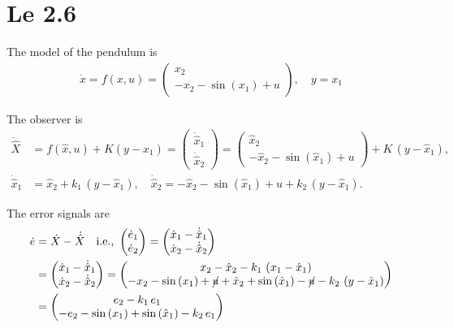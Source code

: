 \section{Le 2.6}
The model of the pendulum is 
\begin{align*}
    \dot x = f(x,u) = \begin{pmatrix}
        x_2 \\ -x_2 - \sin\left(x_1\right) + u
    \end{pmatrix}, \quad y = x_1
\end{align*}

The observer is 
\begin{align*}
    \dot{\hat X} &= f(\hat x,u) + K\left(y - \hat x_1\right) = \begin{pmatrix}
        \dot{\hat x}_1 \\ \dot{\hat x}_2
    \end{pmatrix} = \begin{pmatrix}
        \hat x_2 \\ -\hat x_2 - \sin\left(\hat x_1\right) + u
    \end{pmatrix} + K\,\left(y - \hat x_1\right), \\
    \dot{\hat x}_1 &= \hat x_2 + k_1\,\left(y - \hat x_1\right), \quad \dot{\hat x}_2 = -\hat x_2 - \sin\left(\hat x_1\right) + u + k_2\,\left(y - \hat x_1\right).
\end{align*}

The error signals are
\begin{align*}
    \dot e &= \dot X - \dot{\hat X} \quad \text{i.e., } \begin{pmatrix} \dot e_1 \\ \dot e_2 \end{pmatrix} = \begin{pmatrix} \dot x_1 - \dot{\hat x}_1 \\ \dot x_2 - \dot{\hat x}_2 \end{pmatrix} \\
    &= \begin{pmatrix} 
        \dot x_1 - \dot{\hat x}_1 \\ 
        \dot x_2 - \dot{\hat x}_2 
    \end{pmatrix} = \begin{pmatrix}
                        x_2 - \hat x_2 - k_1\,\left(x_1 - \hat x_1\right) \\
                        -x_2 - \sin\left(x_1\right) + \cancel{u} + \hat x_2 + \sin\left(\hat x_1\right) - \cancel{u} - k_2\,\left(y - \hat x_1\right)
                    \end{pmatrix} \\
    &= \begin{pmatrix}
        e_2 - k_1\,e_1 \\
        -e_2 - \sin\left(x_1\right) + \sin\left(\hat x_1\right) - k_2\,e_1
    \end{pmatrix}
\end{align*}

